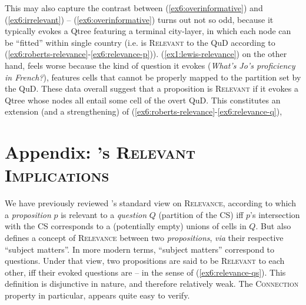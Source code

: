 This may also capture the contrast between (\ref{ex6:overinformative}) and (\ref{ex6:irrelevant}) -- (\ref{ex6:overinformative}) turns out not so odd, because it typically evokes a Qtree featuring a terminal city-layer, in which each node can be ``fitted'' within single country (i.e. is \textsc{Relevant} to the QuD according to (\ref{ex6:roberts-relevance}-\ref{ex6:relevance-p})). (\ref{ex1:lewis-relevance}) on the other hand, feels worse because the kind of question it evokes (\textit{What's Jo's proficiency in French?}), features cells that cannot be properly mapped to the partition set by the QuD. These data overall suggest that a proposition is \textsc{Relevant} if it evokes a Qtree whose nodes all entail some cell of the overt QuD. This constitutes an extension (and a strengthening) of (\ref{ex6:roberts-relevance}-\ref{ex6:relevance-q}),

\fi
\section{Appendix: \citeauthor*{Lewis1988}'s \textsc{Relevant Implications}}\label{sec6:lewis}

We have previously reviewed \textcite{Lewis1988}'s standard view on  \textsc{Relevance}, according to which a \textit{proposition} $p$ is relevant to a \textit{question} $Q$ (partition of the CS) iff $p$'s intersection with the CS corresponds to a (potentially empty) unions of cells in $Q$. But \textcite{Lewis1988} also defines a concept of \textsc{Relevance} between two \textit{propositions}, \textit{via} their respective ``subject matters''. In more modern terms, ``subject matters'' correspond to questions. Under that view, two propositions are said to be \textsc{Relevant} to each other, iff their evoked questions are -- in the sense of (\ref{ex6:relevance-qs}). This definition is disjunctive in nature, and therefore relatively weak. The \textsc{Connection} property in particular, appears quite easy to verify.

\begin{exe}
	\label{ex6:relevance-qs}
\end{exe}

